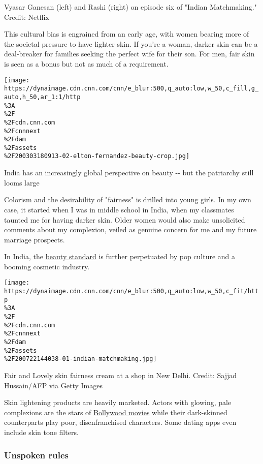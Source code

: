 Vyasar Ganesan (left) and Rashi (right) on episode six of "Indian
Matchmaking." Credit: Netflix

This cultural bias is engrained from an early age, with women bearing
more of the societal pressure to have lighter skin. If you're a woman,
darker skin can be a deal-breaker for families seeking the perfect wife
for their son. For men, fair skin is seen as a bonus but not as much of
a requirement.

\href{/style/article/elton-fernandez-makeup-beauty-opinion/index.html}{}

\texttt{[image: https://dynaimage.cdn.cnn.com/cnn/e\_blur:500,q\_auto:low,w\_50,c\_fill,g\_auto,h\_50,ar\_1:1/http\\\%3A\\\%2F\\\%2Fcdn.cnn.com\\\%2Fcnnnext\\\%2Fdam\\\%2Fassets\\\%2F200303180913-02-elton-fernandez-beauty-crop.jpg]}

India has an increasingly global perspective on beauty -\/- but the
patriarchy still looms large

Colorism and the desirability of "fairness" is drilled into young girls.
In my own case, it started when I was in middle school in India, when my
classmates taunted me for having darker skin. Older women would also
make unsolicited comments about my complexion, veiled as genuine concern
for me and my future marriage prospects.

In India, the
\href{https://edition.cnn.com/style/article/elton-fernandez-makeup-beauty-opinion/index.html}{beauty
standard} is further perpetuated by pop culture and a booming cosmetic
industry.

\texttt{[image: https://dynaimage.cdn.cnn.com/cnn/e\_blur:500,q\_auto:low,w\_50,c\_fit/http\\\%3A\\\%2F\\\%2Fcdn.cnn.com\\\%2Fcnnnext\\\%2Fdam\\\%2Fassets\\\%2F200722144038-01-indian-matchmaking.jpg]}

Fair and Lovely skin fairness cream at a shop in New Delhi. Credit:
Sajjad Hussain/AFP via Getty Images

Skin lightening products are heavily marketed. Actors with glowing, pale
complexions are the stars of
\href{https://edition.cnn.com/style/article/india-bollywood-brownface-hnk-intl/index.html}{Bollywood
movies} while their dark-skinned counterparts play poor, disenfranchised
characters. Some dating apps even include skin tone filters.

\hypertarget{unspoken-rules}{%
\subsubsection{Unspoken rules}\label{unspoken-rules}}

